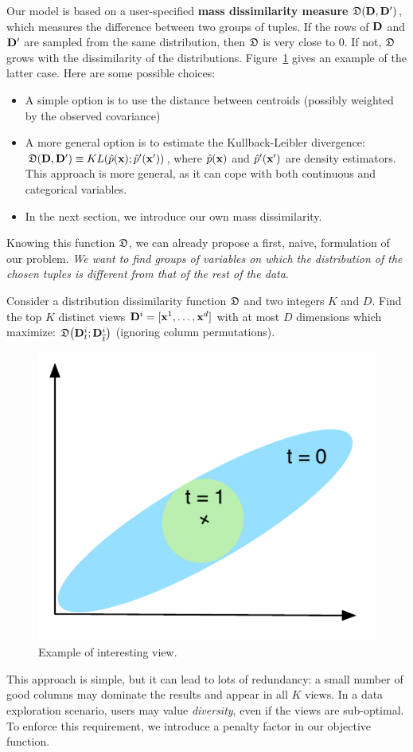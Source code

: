 Our model is based on a user-specified \textbf{mass dissimilarity measure}
$\mathfrak{D}(\mathbf{D}, \mathbf{D}')$, which measures the difference between two groups of
tuples. If the rows of $\mathbf{D}$ and $\mathbf{D}'$ are sampled from the same
distribution, then $\mathfrak{D}$ is very close to 0. If
not, $\mathfrak{D}$ grows with the dissimilarity of the distributions.
Figure~\ref{pic:sameMean} gives an example of the latter case.  Here are some
possible choices:
\begin{itemize}
    \item A simple option is to use the distance between centroids (possibly
        weighted by the observed covariance)
    \item A more general option is to estimate the Kullback-Leibler divergence:
        $\mathfrak{D}(\mathbf{D}, \mathbf{D}') \equiv KL(\hat{p}(\mathbf{x});
        \hat{p}'(\mathbf{x}'))$, where $\hat{p}(\mathbf{x})$ and $\hat{p}'(\mathbf{x}')$
        are density estimators. This approach is more general, as it can cope
        with both continuous and categorical variables.
    \item In the next section, we introduce our own mass dissimilarity.
\end{itemize}
Knowing this function $\mathfrak{D}$, we can already propose a first, naive,
formulation of our problem. \emph{We want to find groups of variables on which the
distribution of the chosen tuples is different from that of the rest of the
data}.
\begin{problem}
    Consider a distribution dissimilarity function $\mathfrak{D}$ and two integers
    $K$ and $D$. Find the top $K$ distinct views $\mathbf{D}^i = [\mathbf{x}^1, \dots,
    \mathbf{x}^d]$ with at most $D$ dimensions which maximize: $ \mathfrak{D}\big(
    \mathbf{D}^i_t ; \mathbf{D}^i_{\overline{t}} \big)$ (ignoring column permutations).
\end{problem}
\begin{figure}
  \centering
  \includegraphics[width=0.8\columnwidth]{Figures/SameMean}
  \caption{Example of interesting view.}
  \label{pic:sameMean}
\end{figure}
This approach is simple, but it can lead to lots of redundancy: a small number
of good columns may dominate the results and appear in all $K$ views. In a data
exploration scenario, users may value \emph{diversity}, even if the views are
sub-optimal. To enforce this requirement, we introduce a penalty factor in our
objective function.

